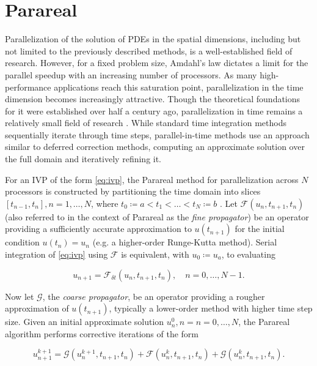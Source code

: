 \section{Parareal}

Parallelization of the solution of PDEs in the spatial dimensions, including but not limited to the previously described methods, is a well-established field of research. However, for a fixed problem size, Amdahl's law dictates a limit for the parallel speedup with an increasing number of processors. As many high-performance applications reach this saturation point, parallelization in the time dimension becomes increasingly attractive. Though the theoretical foundations for it were established over half a century ago, parallelization in time remains a relatively small field of research \cite{dongarra2014applied}. While standard time integration methods sequentially iterate through time steps, parallel-in-time methods use an approach similar to deferred correction methods, computing an approximate solution over the full domain and iteratively refining it.

For an IVP of the form \ref{eq:ivp}, the Parareal method for parallelization across \(N\) processors is constructed \cite{ruprecht2014convergence}\cite{gander2007analysis} by partitioning the time domain into slices \([t_{n-1}, t_n], n = 1,\dots,N\), where \(t_0 \coloneqq a < t_1 < \dots < t_N \coloneqq b\) . Let \(\mathcal{F}(u_n, t_{n+1}, t_n)\) (also referred to in the context of Parareal as the \textit{fine propagator}) be an operator providing a sufficiently accurate approximation to \(u(t_{n+1})\) for the initial condition \(u(t_n)=u_n\) (e.g. a higher-order Runge-Kutta method). Serial integration of \ref{eq:ivp} using \(\mathcal{F}\) is equivalent, with \(u_0 \coloneqq u_a\), to evaluating

\begin{equation}
    u_{n+1} = \mathcal{F}_{\delta t}(u_n, t_{n+1}, t_n), \quad n = 0,\dots,N-1.
    \label{eq:parareal_seq}
\end{equation}

Now let \(\mathcal{G}\), the \textit{coarse propagator}, be an operator providing a rougher approximation of \(u(t_{n+1})\), typically a lower-order method with higher time step size. Given an initial approximate solution \(u_n^0, n = n = 0,\dots,N\), the Parareal algorithm performs corrective iterations of the form

\begin{equation}
    u^{k+1}_{n+1} = \mathcal{G}(u^{k+1}_n, t_{n+1}, t_n) + \mathcal{F}(u^k_n, t_{n+1}, t_n) + \mathcal{G}(u^k_n, t_{n+1}, t_n).
    \label{eq:parareal_it}
\end{equation}

